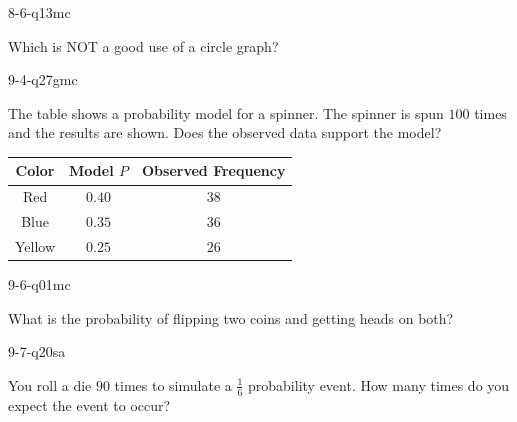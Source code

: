 \begin{practiceQuestion}{8-6-q13}{mc}
\begin{questionText}
Which is NOT a good use of a circle graph?
\end{questionText}
\end{practiceQuestion}

\begin{practiceQuestion}{9-4-q27}{gmc}
\begin{questionText}
The table shows a probability model for a spinner. The spinner is spun $100$ times and the results are shown. Does the observed data support the model?

\begin{center}
\begin{tabular}{|c|c|c|}
\hline
\textbf{Color} & \textbf{Model $P$} & \textbf{Observed Frequency} \\
\hline
Red & $0.40$ & $38$ \\
\hline
Blue & $0.35$ & $36$ \\
\hline
Yellow & $0.25$ & $26$ \\
\hline
\end{tabular}
\end{center}
\end{questionText}
\end{practiceQuestion}

\begin{practiceQuestion}{9-6-q01}{mc}
\begin{questionText}
What is the probability of flipping two coins and getting heads on both?
\end{questionText}
\end{practiceQuestion}

\begin{practiceQuestion}{9-7-q20}{sa}
\begin{questionText}
You roll a die $90$ times to simulate a $\frac{1}{6}$ probability event. How many times do you expect the event to occur?
\end{questionText}
\end{practiceQuestion}
